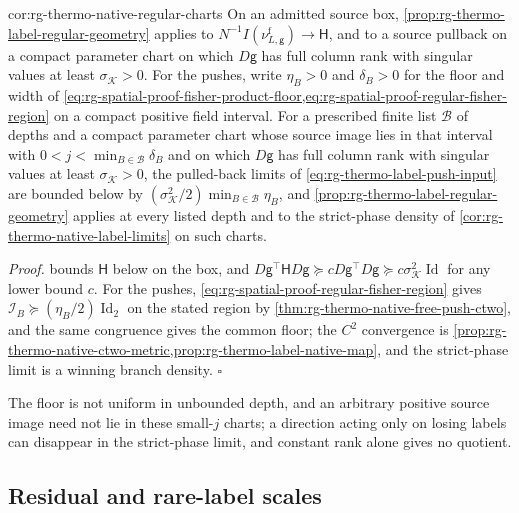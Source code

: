{cor:rg-thermo-native-regular-charts}
On an admitted source box, \cref{prop:rg-thermo-label-regular-geometry}
applies to $N^{-1}I(\nu^{\mathrm f}_{L,\mathsf g})\to\mathsf H$, and to a
source pullback on a compact parameter chart on which $D\mathsf g$ has full column
rank with singular values at least $\sigma_{\mathcal K}>0$. For the pushes,
write $\eta_B>0$ and $\delta_B>0$ for the floor and width of
\cref{eq:rg-spatial-proof-fisher-product-floor,eq:rg-spatial-proof-regular-fisher-region}
on a compact positive field interval. For a prescribed finite list
$\mathcal B$ of depths and a compact parameter chart whose source image lies
in that interval with $0<j<\min_{B\in\mathcal B}\delta_B$ and on which $D\mathsf g$
has full column rank with singular values at least $\sigma_{\mathcal K}>0$, the
pulled-back limits
of \cref{eq:rg-thermo-label-push-input} are bounded below by
$(\sigma_{\mathcal K}^2/2)\min_{B\in\mathcal B}\eta_B$, and
\cref{prop:rg-thermo-label-regular-geometry} applies at every listed depth
and to the strict-phase density of \cref{cor:rg-thermo-native-label-limits}
on such charts. 

\noindent\emph{Proof.}
 bounds $\mathsf H$ below on
the box, and $D\mathsf g^\top\mathsf HD\mathsf g\succeq cD\mathsf g^\top D\mathsf g\succeq
c\sigma_{\mathcal K}^2\operatorname{Id}$ for any lower bound $c$. For the
pushes, \cref{eq:rg-spatial-proof-regular-fisher-region} gives
$\mathcal I_B\succeq(\eta_B/2)\operatorname{Id}_2$ on the stated region by
\cref{thm:rg-thermo-native-free-push-ctwo}, and the same congruence gives the
common floor; the $C^2$ convergence is
\cref{prop:rg-thermo-native-ctwo-metric,prop:rg-thermo-label-native-map}, and
the strict-phase limit is a winning branch density. $\square$

The floor is not uniform in unbounded depth, and an arbitrary positive source
image need not lie in these small-$j$ charts; a direction acting only on
losing labels can disappear in the strict-phase limit, and constant rank alone
gives no quotient.

\subsection{Residual and rare-label scales}
\label{sec:rg-thermo-label-ties}

